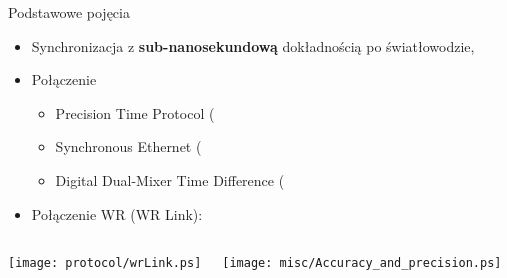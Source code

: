 \documentclass[compress,red]{beamer}
\begin{document}
\begin{frame}{Podstawowe pojęcia}

  \begin{itemize}
    \item Synchronizacja z {\bf sub-nanosekundową} dokładnością po światłowodzie,
    \item Połączenie
	\begin{itemize}
	  \item Precision Time Protocol (\color{blue}{PTP}\color{black}{) - synchronizacja,}
	  \item Synchronous Ethernet (\color{blue}{SyncE}\color{black}{) syntonizacja,}
	  \item Digital Dual-Mixer Time Difference (\color{blue}{DDMTD}\color{black}{) - pomiar fazy,}

	\end{itemize}
    \item Połączenie WR (WR Link):
  \end{itemize}

\begin{columns}[c]

  \begin{center}
  \texttt{[image: protocol/wrLink.ps]}
  \end{center}

  \vspace{2cm}


  \begin{center}
  \texttt{[image: misc/Accuracy\_and\_precision.ps]}
  \end{center}

  \vspace{1cm}

\end{columns}


\end{frame}
\end{document}
